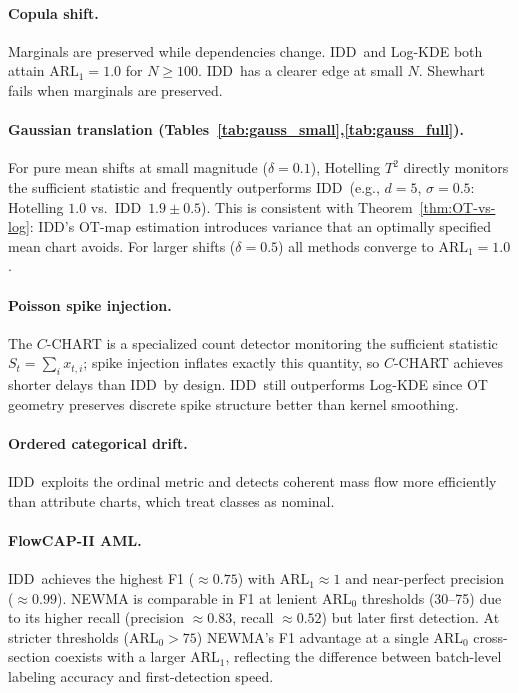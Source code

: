 \documentclass{article}
\newcommand{\algoname}{\textsc{IDD}\xspace}
\theoremstyle{plain}
\theoremstyle{definition}
\theoremstyle{remark}
\begin{document}
\paragraph{Copula shift.} Marginals are preserved while dependencies change. \algoname\ and Log-KDE both attain $\mathrm{ARL}_1=1.0$ for $N\ge 100$. \algoname\ has a clearer edge at small $N$. Shewhart fails when marginals are preserved.

\paragraph{Gaussian translation (Tables~\ref{tab:gauss_small},\ref{tab:gauss_full}).} For pure mean shifts at small magnitude ($\delta=0.1$), Hotelling $T^2$ directly monitors the sufficient statistic and frequently outperforms \algoname\ (e.g., $d{=}5,\,\sigma{=}0.5$: Hotelling $1.0$ vs.\ \algoname\ $1.9\pm 0.5$). This is consistent with Theorem~\ref{thm:OT-vs-log}: \algoname's OT-map estimation introduces variance that an optimally specified mean chart avoids. For larger shifts ($\delta=0.5$) all methods converge to $\mathrm{ARL}_1=1.0$.

\paragraph{Poisson spike injection.} The $C$-CHART is a specialized count detector monitoring the sufficient statistic $S_t = \sum_i x_{t,i}$; spike injection inflates exactly this quantity, so $C$-CHART achieves shorter delays than \algoname\ by design. \algoname\ still outperforms Log-KDE since OT geometry preserves discrete spike structure better than kernel smoothing.

\paragraph{Ordered categorical drift.} \algoname\ exploits the ordinal metric and detects coherent mass flow more efficiently than attribute charts, which treat classes as nominal.

\paragraph{FlowCAP-II AML.} \algoname\ achieves the highest F1 ($\approx 0.75$) with $\mathrm{ARL}_1\approx 1$ and near-perfect precision ($\approx 0.99$). NEWMA is comparable in F1 at lenient $\mathrm{ARL}_0$ thresholds (30--75) due to its higher recall (precision $\approx 0.83$, recall $\approx 0.52$) but later first detection. At stricter thresholds ($\mathrm{ARL}_0>75$) NEWMA's F1 advantage at a single $\mathrm{ARL}_0$ cross-section coexists with a larger $\mathrm{ARL}_1$, reflecting the difference between batch-level labeling accuracy and first-detection speed.
\end{document}
